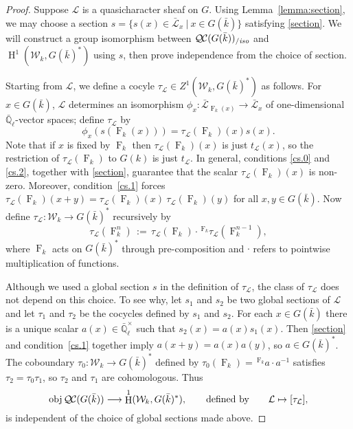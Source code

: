 \documentclass[11pt]{amsart}
\theoremstyle{plain}
\theoremstyle{definition}
\theoremstyle{remark}
\newcommand{\EE}{\mathbb{\bar Q}_\ell}
\newcommand{\bFq}{\bar{k}}
\newcommand{\Fq}{k}
\newcommand{\EEx}{\EE^\times}
\newcommand{\Frob}[1]{\operatorname{F}_{#1}}
\DeclareMathOperator{\Hh}{H}
\newcommand{\ceq}{{\, :=\, }}
\newcommand{\tq}{{\ \vert\ }}
\newcommand{\obj}{{\text{obj}\, }}
\newcommand{\cs}[1]{{\mathcal{#1}}}
\newcommand{\gcs}[1]{{\mathcal{\bar #1}}}
\newcommand{\QC}{{\mathcal{Q\hskip-0.8pt C}}}
\newcommand{\QCiso}[1]{\QC(#1)_{/\textit{iso}}}
\newcommand{\Weil}[1]{\mathcal{W}_{#1}}
\newcommand{\trFrob}[1]{t_{#1}}
\begin{document}
\begin{proof}
  Suppose $\cs{L}$ is a quasicharacter sheaf on $G$.  Using Lemma~\ref{lemma:section}, we may choose a section $s = \{ s(x) \in \gcs{L}_x \tq x \in G(\bFq) \}$ satisfying \eqref{section}.  We will construct a group isomorphism between $\QCiso{G(\bFq)}$ and
  $\Hh^1(\Weil{\Fq}, G(\bFq)^*)$ using $s$, then prove independence from the choice of section.

  Starting from $\cs{L}$, we define a cocyle $\tau_{\cs{L}} \in Z^1(\Weil{\Fq},G(\bFq)^*)$ as follows.
  For $x \in G(\bFq)$, $\cs{L}$ determines an isomorphism $\phi_x : \gcs{L}_{\Frob{\Fq}(x)} \to \gcs{L}_x$
  of one-dimensional $\EE$-vector spaces; define $\tau_\cs{L}$ by
  \begin{equation}\label{t}
   \phi_{x}(s(\Frob{\Fq}(x))) = \tau_\cs{L}(\Frob{\Fq})(x) s(x).
  \end{equation}
  Note that if $x$ is fixed by $\Frob{k}$ then $\tau_\cs{L}(\Frob{\Fq})(x)$ is just $\trFrob{\cs{L}}(x)$, so the restriction of
  $\tau_\cs{L}(\Frob{k})$ to $G(k)$ is just $\trFrob{\cs{L}}$.
  In general, conditions \ref{cs.0} and \ref{cs.2}, together with \eqref{section}, guarantee that
  the scalar $\tau_\cs{L}(\Frob{k})(x)$ is non-zero.  Moreover, condition~\ref{cs.1} forces
  $\tau_\cs{L}(\Frob{\Fq})(x+y) = \tau_\cs{L}(\Frob{\Fq})(x) \ \tau_\cs{L}(\Frob{\Fq})(y)$
  for all $x,y \in G(\bFq)$.  Now define $\tau_\cs{L} : \Weil{\Fq} \to G(\bFq)^*$ recursively by
  \[
   \tau_\cs{L}(\Frob{\Fq}^n) \ceq \tau_\cs{L}(\Frob{\Fq})\cdot \,^{\Frob{\Fq}} \tau_\cs{L}(\Frob{\Fq}^{n-1}),
  \]
  where $\Frob{\Fq}$ acts on $G(\bFq)^*$ through pre-composition and $\cdot$ refers
  to pointwise multiplication of functions.

  Although we used a global section $s$ in the definition of
  $\tau_\cs{L}$, the class of $\tau_\cs{L}$ does not depend on this
  choice. To see why, let $s_1$ and $s_2$ be two global sections of
  $\cs{L}$ and let $\tau_1$ and $\tau_2$ be the cocycles defined by $s_1$ and $s_2$.
  For each $x \in G(\bFq)$ there is a unique scalar
  $a(x) \in \EEx$ such that $s_2(x) = a(x) s_1(x)$. Then \eqref{section} and
  condition~\ref{cs.1} together imply $a(x+y) = a(x)a(y)$, so
  $a\in G(\bFq)^*$.  The coboundary $\tau_0 : \Weil{\Fq} \to G(\bFq)^*$
  defined by $\tau_0(\Frob{\Fq}) = \,^{\Frob{\Fq}} a \cdot a^{-1}$ satisfies $\tau_2 = \tau_0 \tau_1$,
  so $\tau_2$ and $\tau_1$ are cohomologous. Thus
  \begin{equation}\label{cohomologous}
    \obj \QC(G(\bFq)) \longrightarrow \Hh^1(\Weil{\Fq},G(\bFq)^*),
    \qquad \text{defined by} \qquad \cs{L} \mapsto [\tau_\cs{L}],
  \end{equation}
  is independent of the choice of global sections made above.


\end{proof}
\end{document}
